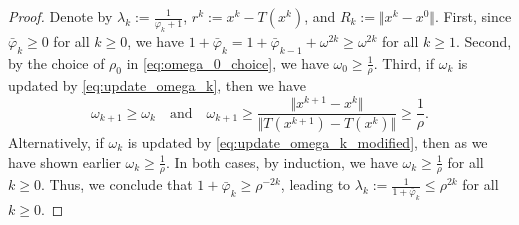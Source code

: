 \documentclass[10pt,a4paper]{amsart}
\newcommand{\norms}[1]{\Vert#1\Vert}
\begin{document}
\begin{proof}
Denote by $\lambda_k := \frac{1}{\varphi_k + 1}$, $r^k := x^k - T(x^k)$, and $R_k := \norms{x^k - x^0}$.
First, since $\bar{\varphi}_k \geq 0$ for all $k \geq 0$, we have $1 + \bar{\varphi}_k = 1 + \bar{\varphi}_{k-1} + \omega^{2k} \geq \omega^{2k}$ for all $k \geq 1$.
Second, by the choice of $\rho_0$ in \eqref{eq:omega_0_choice}, we have $\omega_0 \geq \frac{1}{\rho}$.
Third, if $\omega_k$ is updated by \eqref{eq:update_omega_k}, then we have 
\begin{equation*}
\omega_{k+1} \geq \omega_k \quad \textrm{and} \quad \omega_{k+1} \geq \frac{\norms{x^{k+1} - x^k } }{ \norms{T(x^{k+1}) - T(x^{k})} } \geq \frac{1}{\rho}.
\end{equation*}
Alternatively, if $\omega_k$ is updated by \eqref{eq:update_omega_k_modified}, then as we have shown earlier $\omega_k \geq \frac{1}{\rho}$.
In both cases, by induction, we have $\omega_k \geq \frac{1}{\rho}$ for all $k \geq 0$.
Thus, we conclude that $1 + \bar{\varphi}_k \geq \rho^{-2k}$, leading to $\lambda_k := \frac{1}{1+ \bar{\varphi}_k} \leq \rho^{2k}$ for all $k \geq 0$.


\end{proof}
\end{document}
